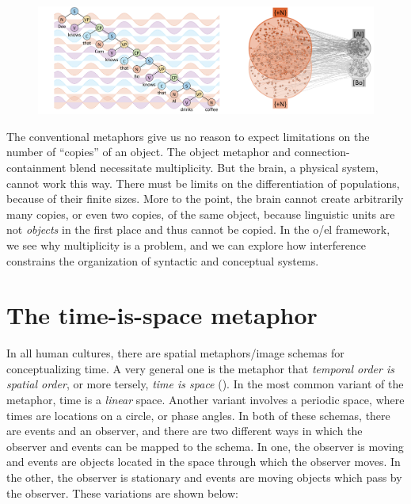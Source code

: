  
\begin{figure}
\includegraphics[width=\textwidth]{figures/Tilsen-img37.png}
\caption{\missingcaption}
\label{fig:3:9}
\end{figure}
 

  The conventional metaphors give us no reason to expect limitations on the number of “copies” of an object. The object metaphor and connection-containment blend necessitate multiplicity. But the brain, a physical system, cannot work this way. There must be limits on the differentiation of populations, because of their finite sizes. More to the point, the brain cannot create arbitrarily many copies, or even two copies, of the same object, because linguistic units are not \textit{objects} in the first place and thus cannot be copied. In the o/el framework, we see why multiplicity is a problem, and we can explore how interference constrains the organization of syntactic and conceptual systems.

\section{The time-is-space metaphor}

In all human cultures, there are spatial metaphors/image schemas for conceptualizing time. A very general one is the metaphor that \textit{temporal order is spatial order}, or more tersely, \textit{time is space} (\citealt{Boroditsky2000,Boroditsky2001,CasasantoBoroditsky2008,Evans2006,GentnerEtAl2002,LakoffJohnson1999,NúñezEtAl2006}). In the most common variant of the metaphor, time is a \textit{linear} space. Another variant involves a periodic space, where times are locations on a circle, or phase angles. In both of these schemas, there are events and an observer, and there are two different ways in which the observer and events can be mapped to the schema. In one, the observer is moving and events are objects located in the space through which the observer moves. In the other, the observer is stationary and events are moving objects which pass by the observer. These variations are shown below:

